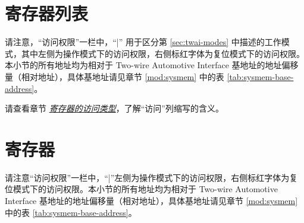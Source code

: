 \documentclass[main\_\_CN.tex]{subfiles}
\begin{document}
\clearpage
\section{寄存器列表}
\label{sec:twai-reg-summ}
\hypertarget{twai-reg-summ}{}

请注意，“访问权限”一栏中，“|” 用于区分第 \ref{sec:twai-modes} 中描述的工作模式，其中左侧为操作模式下的访问权限，右侧标红字体为复位模式下的访问权限。本小节的所有地址均为相对于 Two-wire Automotive Interface 基地址的地址偏移量（相对地址），具体基地址请见章节 \ref{mod:sysmem} \textit{} 中的表 \ref{tab:sysmem-base-address}。

请查看章节 \hyperref[glossary-access-types]{\textit{寄存器的访问类型}}，了解“访问”列缩写的含义。






\clearpage
\section{寄存器}

请注意“访问权限”一栏中，“|”左侧为操作模式下的访问权限，右侧标红字体为复位模式下的访问权限。本小节的所有地址均为相对于 Two-wire Automotive Interface 基地址的地址偏移量（相对地址），具体基地址请见章节 \ref{mod:sysmem} \textit{} 中的表 \ref{tab:sysmem-base-address}。


\end{document}
